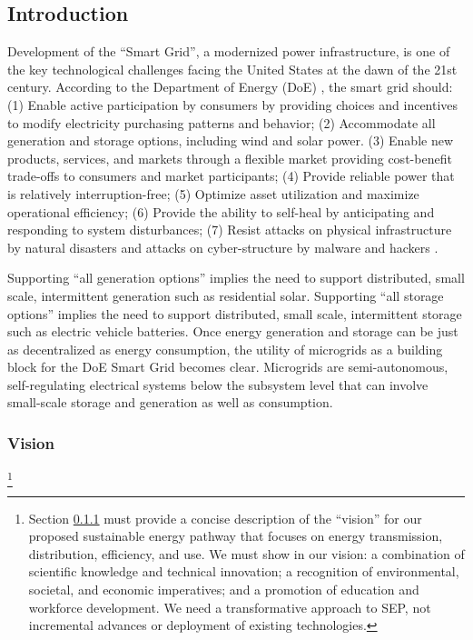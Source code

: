 
\subsection{Introduction}

Development of the ``Smart Grid'', a modernized power infrastructure, is
one of the key technological challenges facing the United States at the
dawn of the 21st century. According to the Department of Energy (DoE) , the smart
grid should: (1) Enable active participation by consumers by providing
choices and incentives to modify electricity purchasing patterns and
behavior; (2) Accommodate all generation and storage options, including
wind and solar power.  (3) Enable new products, services, and markets
through a flexible market providing cost-benefit trade-offs to consumers
and market participants; (4) Provide reliable power that is relatively
interruption-free; (5) Optimize asset utilization and maximize operational
efficiency; (6) Provide the ability to self-heal by anticipating and
responding to system disturbances; (7) Resist attacks on physical
infrastructure by natural disasters and attacks on cyber-structure by
malware and hackers \cite{NETL:GridCharacteristics}.

Supporting ``all generation options'' implies the need to support
distributed, small scale, intermittent generation such as residential
solar.  Supporting ``all storage options'' implies the need to support
distributed, small scale, intermittent storage such as electric vehicle
batteries.  Once energy generation and storage can be just as decentralized
as energy consumption, the utility of microgrids as a building block for
the DoE Smart Grid becomes clear.  Microgrids are semi-autonomous,
self-regulating electrical systems below the subsystem level that can
involve small-scale storage and generation as well as consumption.

\subsubsection{Vision}
\label{sec:vision}

\footnote{Section \ref{sec:vision} must provide a concise description of the ``vision'' for our
  proposed sustainable energy pathway that focuses on energy transmission,
  distribution, efficiency, and use.
  We must show in our vision: a combination of scientific knowledge and
  technical innovation; a recognition of environmental, societal, and
  economic imperatives; and a promotion of education and workforce
  development.
  We need a transformative approach to SEP, not incremental advances or
  deployment of existing technologies. }

